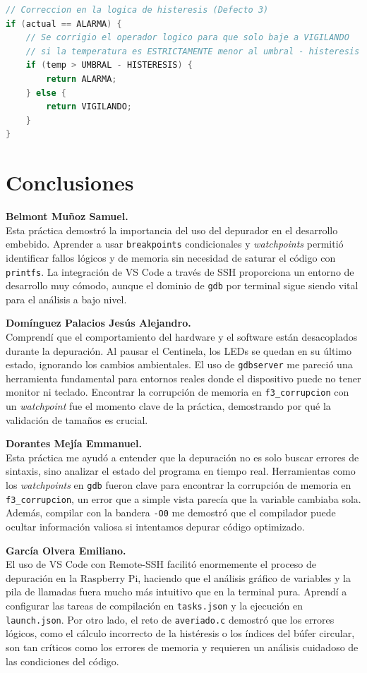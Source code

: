 \documentclass[conference]{IEEEtran}
\begin{document}
\begin{lstlisting}[language=C]
// Correccion en la logica de histeresis (Defecto 3)
if (actual == ALARMA) {
    // Se corrigio el operador logico para que solo baje a VIGILANDO
    // si la temperatura es ESTRICTAMENTE menor al umbral - histeresis
    if (temp > UMBRAL - HISTERESIS) {
        return ALARMA;
    } else {
        return VIGILANDO;
    }
}
\end{lstlisting}

\section{Conclusiones}

\textbf{Belmont Muñoz Samuel.} \\
Esta práctica demostró la importancia del uso del depurador en el desarrollo embebido. Aprender a usar \texttt{breakpoints} condicionales y \textit{watchpoints} permitió identificar fallos lógicos y de memoria sin necesidad de saturar el código con \texttt{printfs}. La integración de VS Code a través de SSH proporciona un entorno de desarrollo muy cómodo, aunque el dominio de \texttt{gdb} por terminal sigue siendo vital para el análisis a bajo nivel.

\textbf{Domínguez Palacios Jesús Alejandro.} \\
Comprendí que el comportamiento del hardware y el software están desacoplados durante la depuración. Al pausar el Centinela, los LEDs se quedan en su último estado, ignorando los cambios ambientales. El uso de \texttt{gdbserver} me pareció una herramienta fundamental para entornos reales donde el dispositivo puede no tener monitor ni teclado. Encontrar la corrupción de memoria en \texttt{f3\_corrupcion} con un \textit{watchpoint} fue el momento clave de la práctica, demostrando por qué la validación de tamaños es crucial.

\textbf{Dorantes Mejía Emmanuel.} \\
Esta práctica me ayudó a entender que la depuración no es solo buscar errores de sintaxis, sino analizar el estado del programa en tiempo real. Herramientas como los \textit{watchpoints} en \texttt{gdb} fueron clave para encontrar la corrupción de memoria en \texttt{f3\_corrupcion}, un error que a simple vista parecía que la variable cambiaba sola. Además, compilar con la bandera \texttt{-O0} me demostró que el compilador puede ocultar información valiosa si intentamos depurar código optimizado. 

\textbf{García Olvera Emiliano.} \\
El uso de VS Code con Remote-SSH facilitó enormemente el proceso de depuración en la Raspberry Pi, haciendo que el análisis gráfico de variables y la pila de llamadas fuera mucho más intuitivo que en la terminal pura. Aprendí a configurar las tareas de compilación en \texttt{tasks.json} y la ejecución en \texttt{launch.json}. Por otro lado, el reto de \texttt{averiado.c} demostró que los errores lógicos, como el cálculo incorrecto de la histéresis o los índices del búfer circular, son tan críticos como los errores de memoria y requieren un análisis cuidadoso de las condiciones del código.
\end{document}
